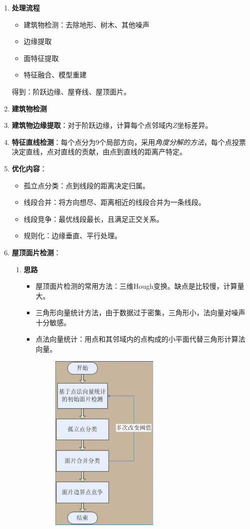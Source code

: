 \begin{enumerate}
	\item \textbf{处理流程}
		\begin{itemize}
			\item 建筑物检测：去除地形、树木、其他噪声
			\item 边缘提取
			\item 面特征提取
			\item 特征融合、模型重建
		\end{itemize}
		得到：阶跃边缘、屋脊线、屋顶面片。
	\item \textbf{建筑物检测}
	\item \textbf{建筑物边缘提取}：对于阶跃边缘，计算每个点邻域内$ Z $坐标差异。
	\item \textbf{特征直线检测}：每个点分为9个局部方向，采用\textit{角度分解的方法}，每个点投票决定直线，点对直线的贡献，由点到直线的距离产特定。
	\item \textbf{优化内容}：
		\begin{itemize}
			\item 孤立点分类：点到线段的距离决定归属。
			\item 线段合并：将方向想尽、距离相近的线段合并为一条线段。
			\item 线段竞争：最优线段最长，且满足正交关系。
			\item 规则化：边缘垂直、平行处理。
		\end{itemize}
	\item \textbf{屋顶面片检测}：
		\begin{enumerate}
			\item \textbf{思路}
				\begin{itemize}
					\item 屋顶面片检测的常用方法：三维Hough变换。缺点是比较慢，计算量大。
					\item 三角形向量统计方法，由于数据过于密集，三角形小，法向量对噪声十分敏感。
					\item 点法向量统计：用点和其邻域内的点构成的小平面代替三角形计算法向量。
					\begin{figure}[htbp]
						\centering
						\includegraphics[width=0.3\linewidth]{figure/Chapter6/点法向量统计处理流程}

\end{figure}
\end{itemize}
\end{enumerate}
\end{enumerate}
